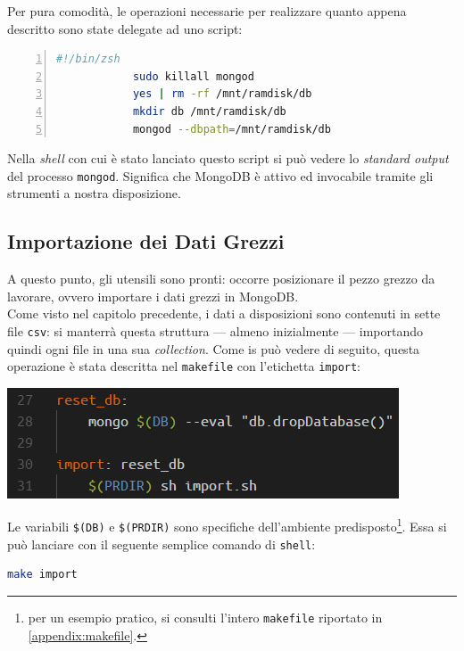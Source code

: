 	Per pura comodità, le operazioni necessarie per realizzare quanto appena descritto sono state delegate ad uno script:

		\begin{lstlisting}[language=bash,caption={script di lancio di un server MongoDB}, numbers=left, stepnumber=1]
			#!/bin/zsh
			sudo killall mongod
			yes | rm -rf /mnt/ramdisk/db
			mkdir db /mnt/ramdisk/db
			mongod --dbpath=/mnt/ramdisk/db
		\end{lstlisting}

	Nella \textit{shell} con cui è stato lanciato questo script si può vedere lo \textit{standard output} del processo \texttt{mongod}. Significa che MongoDB è attivo ed invocabile tramite gli strumenti a nostra disposizione.

	\subsection{Importazione dei Dati Grezzi}

	A questo punto, gli utensili sono pronti: occorre posizionare il pezzo grezzo da lavorare, ovvero importare i dati grezzi in MongoDB. \\

	Come visto nel capitolo precedente, i dati a disposizioni sono contenuti in sette file \texttt{csv}: si manterrà questa struttura --- almeno inizialmente --- importando quindi ogni file in una sua \textit{collection}. Come is può vedere di seguito, questa operazione è stata descritta nel \texttt{makefile} con l'etichetta \texttt{import}:

	\begin{center}
		\includegraphics[scale=0.7]{img/import.png}
	\end{center}

	Le variabili \texttt{\$(DB)} e \texttt{\$(PRDIR)} sono specifiche dell'ambiente predisposto\footnote{per un esempio pratico, si consulti l'intero \texttt{makefile} riportato in \ref{appendix:makefile}.}. Essa si può lanciare con il seguente semplice comando di \texttt{shell}:

	\begin{lstlisting}[language=bash,caption={importazione dei dati in MongoDB}]
		make import
	\end{lstlisting}

